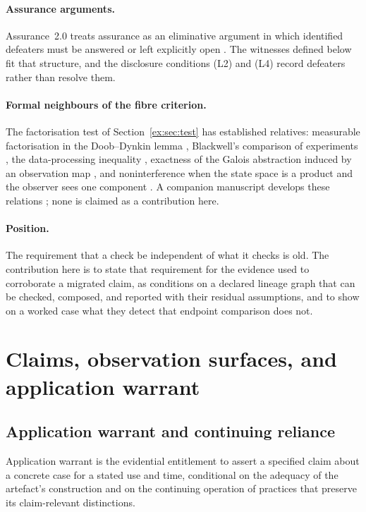 \documentclass[twocolumn,envcountsect,envcountsame,natbib]{svjour3}
\begin{document}
\paragraph{Assurance arguments.} Assurance~2.0 treats assurance as an eliminative argument in which identified defeaters must be answered or left explicitly open \citep{bloomfieldrushby2021,bloomfieldnetkachovarushby2024}. The witnesses defined below fit that structure, and the disclosure conditions (L2) and (L4) record defeaters rather than resolve them.

\paragraph{Formal neighbours of the fibre criterion.} The factorisation test of Section~\ref{ex:sec:test} has established relatives: measurable factorisation in the Doob--Dynkin lemma \citep[Lemma~1.13]{kallenberg2002}, Blackwell's comparison of experiments \citep{blackwell1953}, the data-processing inequality \citep{coverthomas2006}, exactness of the Galois abstraction induced by an observation map \citep{cousot1977}, and noninterference when the state space is a product and the observer sees one component \citep{goguenmeseguer1982}. A companion manuscript develops these relations \citep{moore2026exactness}; none is claimed as a contribution here.

\paragraph{Position.} The requirement that a check be independent of what it checks is old. The contribution here is to state that requirement for the evidence used to corroborate a migrated claim, as conditions on a declared lineage graph that can be checked, composed, and reported with their residual assumptions, and to show on a worked case what they detect that endpoint comparison does not.

\section{Claims, observation surfaces, and application warrant}\label{ex:sec:static}

\subsection{Application warrant and continuing reliance}\label{ex:sec:warrant}

\begin{definition}\label{ex:def:warrant}
Application warrant is the evidential entitlement to assert a specified claim about a concrete case for a stated use and time, conditional on the adequacy of the artefact's construction and on the continuing operation of practices that preserve its claim-relevant distinctions.
\end{definition}
\end{document}
